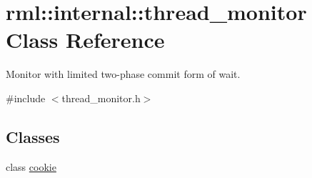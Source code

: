 \hypertarget{classrml_1_1internal_1_1thread__monitor}{}\section{rml\+:\+:internal\+:\+:thread\+\_\+monitor Class Reference}
\label{classrml_1_1internal_1_1thread__monitor}


Monitor with limited two-\/phase commit form of wait.  




{\ttfamily \#include $<$thread\+\_\+monitor.\+h$>$}

\subsection*{Classes}
\begin{DoxyCompactItemize}
\item 
class \hyperlink{classrml_1_1internal_1_1thread__monitor_1_1cookie}{cookie}
\end{DoxyCompactItemize}

